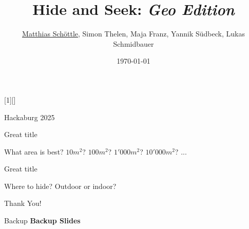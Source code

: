 \documentclass[aspectratio=169,10pt,xcolor=table]{beamer}
\begin{document}
\title[Short Title]{Hide and Seek: \textit{Geo Edition}}
\author[MS/ST/MF/YS/LS]{\underline{Matthias Schöttle}, Simon Thelen, Maja Franz, Yannik Südbeck, Lukas Schmidbauer}
\date{\today}

\newcommand{\fillme}{\vskip0pt plus 1filll}
\newenvironment{references}{\begin{tiny}\begin{flushleft}}%
    {\end{flushleft}\end{tiny}\vspace*{\fill}}
[1][]
{
  \vspace*{1em}\textbf{\inserttitle}\par
  \vspace*{1em}
  \textbf{\insertauthor}\bigskip\par
  \begin{scriptsize}
  Hackaburg 2025 \newline
  \insertdate
  \vfill\tiny\insertinstitute
  \end{scriptsize}
  
}

\maketitle

\begin{frame}{Great title}
  \begin{halfblock}{What area is best?}
    $10m^2$? $100m^2$? $1'000m^2$? $10'000m^2$? ... 
  \end{halfblock}
\end{frame}

\begin{frame}{Great title}
  \begin{halfblock}{Where to hide?}
      Outdoor or indoor?
  \end{halfblock}
\end{frame}

\begin{frame}{Thank You!}
\end{frame}

\begin{appendix}
    \nocite{*}
\begin{frame}{Backup}
  \center
  \LARGE{\textbf{Backup Slides}}
\end{frame}

\end{appendix}
\end{document}
